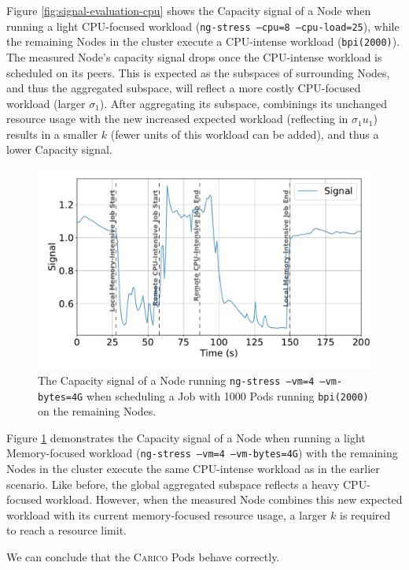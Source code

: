 Figure \ref{fig:signal-evaluation-cpu} shows the Capacity signal of a Node when
running a light CPU-focused workload (\texttt{ng-stress --cpu=8 --cpu-load=25}),
while the remaining Nodes in the cluster execute a CPU-intense workload
(\texttt{bpi(2000)}). The measured Node's capacity signal drops once the
CPU-intense workload is scheduled on its peers. This is expected as the
subspaces of surrounding Nodes, and thus the aggregated subspace, will reflect a
more costly CPU-focused workload (larger $\sigma_1$).  After aggregating its
subspace, combinings its unchanged resource usage with the new increased
expected workload (reflecting in $\sigma_1 u_1$) results in a smaller $k$ (fewer
units of this workload can be added), and thus a lower Capacity signal.

\begin{figure}[ht!]
    \centering
    \includegraphics[width=\textwidth]{images/signal-with-memory.pdf}
    \caption{The Capacity signal of a Node running \texttt{ng-stress
    --vm=4 --vm-bytes=4G} when scheduling a Job with 1000 Pods
    running \texttt{bpi(2000)} on the remaining Nodes.}
    \label{fig:signal-evaluation-mem}
\end{figure}

Figure \ref{fig:signal-evaluation-mem} demonstrates the Capacity signal of a
Node when running a light Memory-focused workload (\texttt{ng-stress --vm=4
--vm-bytes=4G}) with the remaining Nodes in the cluster execute the same
CPU-intense workload as in the earlier scenario. Like before, the global
aggregated subspace reflects a heavy CPU-focused workload. However, when the
measured Node combines this new expected workload with its current
memory-focused resource usage, a larger $k$ is required to reach a resource
limit.

We can conclude that the \textsc{Carico} Pods behave correctly.

